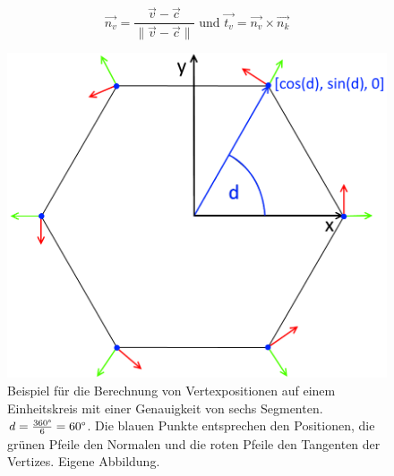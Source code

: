  \begin{equation}
	 \overrightarrow{n_v} = \dfrac{\overrightarrow{v} - \overrightarrow{c}}{\lVert \overrightarrow{v} - \overrightarrow{c} \rVert} \text{ und } \overrightarrow{t_v} = \overrightarrow{n_v} \times \overrightarrow{n_k}
 \end{equation}
\begin{figure} [hbtp]
	\centering
	\includegraphics[height=0.25\textheight]{images/Ring6Sections.png}
	\caption{Beispiel für die Berechnung von Vertexpositionen auf einem Einheitskreis mit einer Genauigkeit von sechs Segmenten. $d = \frac{360\degree}{6} = 60 \degree$. Die blauen Punkte entsprechen den Positionen, die grünen Pfeile den Normalen und die roten Pfeile den Tangenten der Vertizes. Eigene Abbildung.}
	\label{fig:Ring6Sections}
\end{figure}
